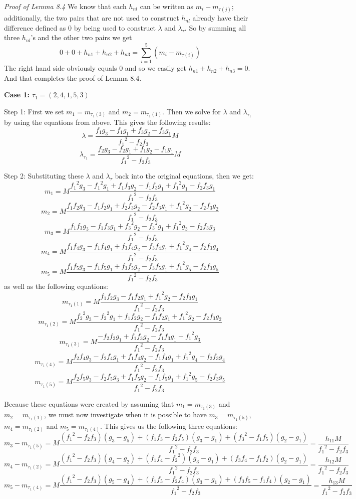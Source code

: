 \documentclass[11pt,leqno]{article}
\theoremstyle{definition}
\theoremstyle{remark}
\numberwithin{equation}{section}
\begin{document}
\textit{Proof of Lemma 8.4}
We know that each $h_{nl}$ can be written as $m_i-m_{\tau(j)}$; additionally, the two pairs that are not used to construct $h_{nl}$ already have their difference defined as $0$ by being used to construct $\lambda$ and $\lambda_\tau$.
So by summing all three $h_{nl}$'s and the other two pairs we get $$0+0+h_{n1}+h_{n2}+h_{n3}=\sum_{i=1}^{5} (m_i-m_{\tau(i)})$$
The right hand side obviously equals $0$ and so we easily get $h_{n1}+h_{n2}+h_{n3}=0$. And that completes the proof of Lemma 8.4.

\textbf{Case 1:} $\tau_1=(2,4,1,5,3)$

Step 1: First we set $m_1=m_{\tau_1(3)}$ and $m_2=m_{\tau_1(1)}$. Then we solve for $\lambda$ and $\lambda_\tau_1$ by using the equations from above. This gives the following results:
$$\lambda=\frac{f_1g_3-f_1g_1+f_3g_2-f_3g_1}{{f_1}^2-f_2f_3}M$$
$$\lambda_{\tau_1}=\frac{f_2g_3-f_2g_1+f_1g_2-f_1g_1}{{f_1}^2-f_2f_3}M$$

Step 2: Substituting these $\lambda$ and $\lambda_\tau$ back into the original equations, then we get:
$$m_1=M\frac{{f_1}^2g_3-{f_1}^2g_1+f_1f_3g_2-f_1f_3g_1+{f_1}^2g_1-f_2f_3g_1}{{f_1}^2-f_2f_3}$$
$$m_2=M\frac{f_1f_2g_3-f_1f_2g_1+f_2f_3g_2-f_2f_3g_1+{f_1}^2g_2-f_2f_3g_2}{{f_1}^2-f_2f_3}$$
$$m_3=M\frac{f_1f_3g_3-f_1f_3g_1+{f_3}^2g_2-{f_3}^2g_1+{f_1}^2g_3-f_2f_3g_3}{{f_1}^2-f_2f_3}$$
$$m_4=M\frac{f_1f_4g_3-f_1f_4g_1+f_3f_4g_2-f_3f_4g_1+{f_1}^2g_4-f_2f_3g_4}{{f_1}^2-f_2f_3}$$
$$m_5=M\frac{f_1f_5g_3-f_1f_5g_1+f_3f_5g_2-f_3f_5g_1+{f_1}^2g_5-f_2f_3g_5}{{f_1}^2-f_2f_3}$$
as well as the following equations:
$$m_{\tau_1(1)}=M\frac{f_1f_2g_3-f_1f_2g_1+{f_1}^2g_2-f_2f_3g_1}{{f_1}^2-f_2f_3}$$
$$m_{\tau_1(2)}=M\frac{{f_2}^2g_3-{f_2}^2g_1+f_1f_2g_2-f_1f_2g_1+{f_1}^2g_2-f_2f_3g_2}{{f_1}^2-f_2f_3}$$
$$m_{\tau_1(3)}=M\frac{-f_2f_3g_1+f_1f_3g_2-f_1f_3g_1+{f_1}^2g_3}{{f_1}^2-f_2f_3}$$
$$m_{\tau_1(4)}=M\frac{f_2f_4g_3-f_2f_4g_1+f_1f_4g_2-f_1f_4g_1+{f_1}^2g_4-f_2f_3g_4}{{f_1}^2-f_2f_3}$$
$$m_{\tau_1(5)}=M\frac{f_2f_5g_3-f_2f_5g_3+f_1f_5g_2-f_1f_5g_1+{f_1}^2g_5-f_2f_3g_5}{{f_1}^2-f_2f_3}$$

Because these equations were created by assuming that $m_1=m_{\tau_1(3)}$ and $m_2=m_{\tau_1(1)}$, we must now investigate when it is possible to have $m_3=m_{\tau_1(5)}$, $m_4=m_{\tau_1(2)}$ and $m_5=m_{\tau_1(4)}$. This gives us the following three equations:
$$m_3-m_{\tau_1(5)}=M\frac{({f_1}^2-f_2f_3)(g_3-g_5)+(f_1f_3-f_2f_5)(g_3-g_1)+({f_3}^2-f_1f_5)(g_2-g_1)}{{f_1}^2-f_2f_3}=\frac{h_{11}M}{{f_1}^2-f_2f_3}$$
$$m_4-m_{\tau_1(2)}=M\frac{({f_1}^2-f_2f_3)(g_4-g_2)+(f_1f_4-{f_2}^2)(g_3-g_1)+(f_3f_4-f_1f_2)(g_2-g_1)}{{f_1}^2-f_2f_3}=\frac{h_{12}M}{{f_1}^2-f_2f_3}$$
$$m_5-m_{\tau_1(4)}=M\frac{({f_1}^2-f_2f_3)(g_5-g_4)+(f_1f_5-f_2f_4)(g_3-g_1)+(f_3f_5-f_1f_4)(g_2-g_1)}{{f_1}^2-f_2f_3}=\frac{h_{13}M}{{f_1}^2-f_2f_3}$$
\end{document}
